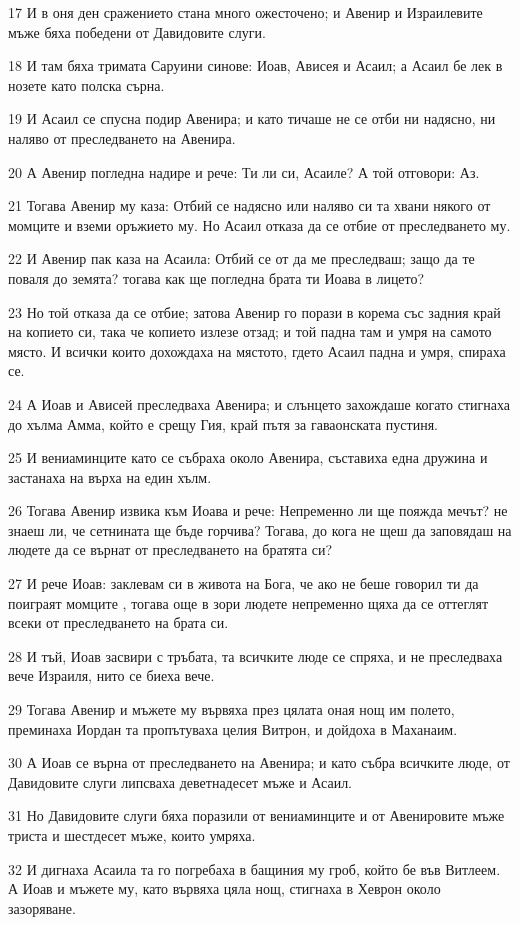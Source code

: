 \par 17 И в оня ден сражението стана много ожесточено; и Авенир и Израилевите мъже бяха победени от Давидовите слуги.
\par 18 И там бяха тримата Саруини синове: Иоав, Ависея и Асаил; а Асаил бе лек в нозете като полска сърна.
\par 19 И Асаил се спусна подир Авенира; и като тичаше не се отби ни надясно, ни наляво от преследването на Авенира.
\par 20 А Авенир погледна надире и рече: Ти ли си, Асаиле? А той отговори: Аз.
\par 21 Тогава Авенир му каза: Отбий се надясно или наляво си та хвани някого от момците и вземи оръжието му. Но Асаил отказа да се отбие от преследването му.
\par 22 И Авенир пак каза на Асаила: Отбий се от да ме преследваш; защо да те поваля до земята? тогава как ще погледна брата ти Иоава в лицето?
\par 23 Но той отказа да се отбие; затова Авенир го порази в корема със задния край на копието си, така че копието излезе отзад; и той падна там и умря на самото място. И всички които дохождаха на мястото, гдето Асаил падна и умря, спираха се.
\par 24 А Иоав и Ависей преследваха Авенира; и слънцето захождаше когато стигнаха до хълма Амма, който е срещу Гия, край пътя за гаваонската пустиня.
\par 25 И вениаминците като се събраха около Авенира, съставиха една дружина и застанаха на върха на един хълм.
\par 26 Тогава Авенир извика към Иоава и рече: Непременно ли ще пояжда мечът? не знаеш ли, че сетнината ще бъде горчива? Тогава, до кога не щеш да заповядаш на людете да се върнат от преследването на братята си?
\par 27 И рече Иоав: заклевам си в живота на Бога, че ако не беше говорил ти да поиграят момците , тогава още в зори людете непременно щяха да се оттеглят всеки от преследването на брата си.
\par 28 И тъй, Иоав засвири с тръбата, та всичките люде се спряха, и не преследваха вече Израиля, нито се биеха вече.
\par 29 Тогава Авенир и мъжете му вървяха през цялата оная нощ им полето, преминаха Иордан та пропътуваха целия Витрон, и дойдоха в Маханаим.
\par 30 А Иоав се върна от преследването на Авенира; и като събра всичките люде, от Давидовите слуги липсваха деветнадесет мъже и Асаил.
\par 31 Но Давидовите слуги бяха поразили от вениаминците и от Авенировите мъже триста и шестдесет мъже, които умряха.
\par 32 И дигнаха Асаила та го погребаха в бащиния му гроб, който бе във Витлеем. А Иоав и мъжете му, като вървяха цяла нощ, стигнаха в Хеврон около зазоряване.

